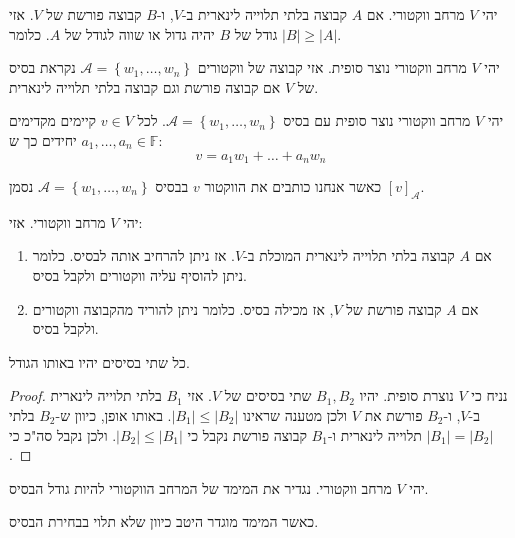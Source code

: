 \documentclass{tstextbook}
\begin{document}
\begin{proposition}
יהי \(V\) מרחב ווקטורי. אם \(A\) קבוצה בלתי תלוייה לינארית ב-\(V\), ו-\(B\) קבוצה פורשת של \(V\). אזי גודל של \(B\) יהיה גדול או שווה לגודל של \(A\). כלומר \(|B|\geq |A|\).

\end{proposition}
\begin{definition}[בסיס]
יהי \(V\) מרחב ווקטורי נוצר סופית. אזי קבוצה של ווקטורים \(\mathcal{A}=\left\{  w_{1},\dots,w_{n}  \right\}\) נקראת בסיס של \(V\) אם קבוצה פורשת וגם קבוצה בלתי תלוייה לינארית.

\end{definition}
\begin{proposition}
יהי \(V\) מרחב ווקטורי נוצר סופית עם בסיס \(\mathcal{A}=\left\{  w_{1},\dots,w_{n}  \right\}\). לכל \(v \in V\) קיימים מקדימים \(a_{1},\dots,a_{n}\in \mathbb{F}\) יחידים כך ש:
$$v=a_{1}w_{1}+\dots+a_{n}w_{n}$$

\end{proposition}
\begin{symbolize}
כאשר אנחנו כותבים את הווקטור \(v\) בבסיס \(\mathcal{A}=\left\{  w_{1},\dots,w_{n}  \right\}\) נסמן \([v]_{\mathcal{A} }\).

\end{symbolize}
\begin{proposition}
יהי \(V\) מרחב ווקטורי. אזי:

  \begin{enumerate}
    \item אם \(A\) קבוצה בלתי תלוייה לינארית המוכלת ב-\(V\). אז ניתן להרחיב אותה לבסיס. כלומר ניתן להוסיף עליה ווקטורים ולקבל בסיס. 


    \item אם \(A\) קבוצה פורשת של \(V\), אז מכילה בסיס. כלומר ניתן להוריד מהקבוצה ווקטורים ולקבל בסיס. 


  \end{enumerate}
\end{proposition}
\begin{proposition}
כל שתי בסיסים יהיו באותו הגודל. 

\end{proposition}
\begin{proof}
נניח כי \(V\) נוצרת סופית. יהיו \(B_{1},B_{2}\) שתי בסיסים של \(V\). אזי \(B_{1}\) בלתי תלוייה לינארית ב-\(V\), ו-\(B_{2}\) פורשת את \(V\) ולכן מטענה שראינו \(|B_{1}|\leq|B_{2}|\). באותו אופן, כיוון ש-\(B_{2}\) בלתי תלוייה לינארית ו-\(B_{1}\) קבוצה פורשת נקבל כי \(|B_{2}|\leq|B_{1}|\). ולכן נקבל סה"כ כי \(|B_{1}|=|B_{2}|\).

\end{proof}
\begin{definition}
יהי \(V\) מרחב ווקטורי. נגדיר את המימד של המרחב הווקטורי להיות גודל הבסיס. 

\end{definition}
כאשר המימד מוגדר היטב כיוון שלא תלוי בבחירת הבסיס.
\end{document}
